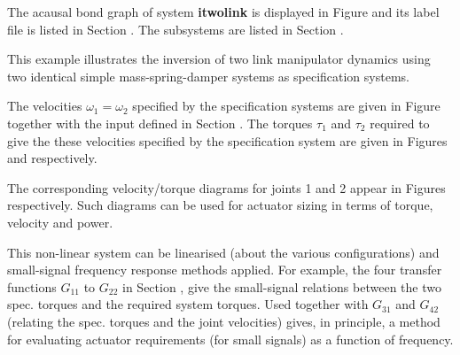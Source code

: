 
%

   The acausal bond graph of system \textbf{itwolink} is
   displayed in Figure  and its label
   file is listed in Section .
   The subsystems are listed in Section .

This example illustrates the inversion of  two link manipulator
dynamics using two identical  simple mass-spring-damper systems as
specification systems.

The velocities $\omega_1=\omega_2$ specified by the specification
systems are given in Figure 
together with the input defined in Section .
The torques $\tau_1$ and $\tau_2$ required to give the these
velocities specified by the specification system are given in Figures
 and
 respectively.

The corresponding velocity/torque diagrams for joints 1 and 2 appear in
Figures 
 respectively.
Such diagrams can be used for actuator sizing in terms of torque,
velocity and power.

 
This non-linear system can be linearised (about the various
configurations) and small-signal frequency response methods applied.
For example, the four transfer functions $G_11$ to $G_22$ in Section
, give the small-signal relations between the two
spec. torques and the required system torques. Used together with
$G_31$ and $G_42$ (relating the spec. torques and the joint
velocities) gives, in principle, a method for evaluating actuator
requirements (for small signals) as a function of frequency.

